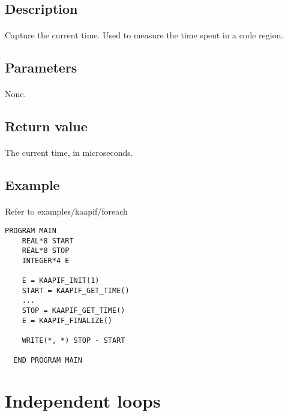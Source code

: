 \documentclass[a4paper, 11pt]{article}
\begin{document}
\subsection{Description}
\paragraph{}
Capture the current time. Used to measure the time spent in a code region.

\subsection{Parameters}
\paragraph{}
None.

\subsection{Return value}
\paragraph{}
The current time, in microseconds.

\subsection{Example}
\paragraph{}
Refer to examples/kaapif/foreach\\

\begin{small}
\begin{lstlisting}[frame=tb]
  PROGRAM MAIN
    REAL*8 START
    REAL*8 STOP
    INTEGER*4 E

    E = KAAPIF_INIT(1)
    START = KAAPIF_GET_TIME()
    ...
    STOP = KAAPIF_GET_TIME()
    E = KAAPIF_FINALIZE()

    WRITE(*, *) STOP - START

  END PROGRAM MAIN
\end{lstlisting}
\end{small}


\newpage
\section{Independent loops}
\end{document}

